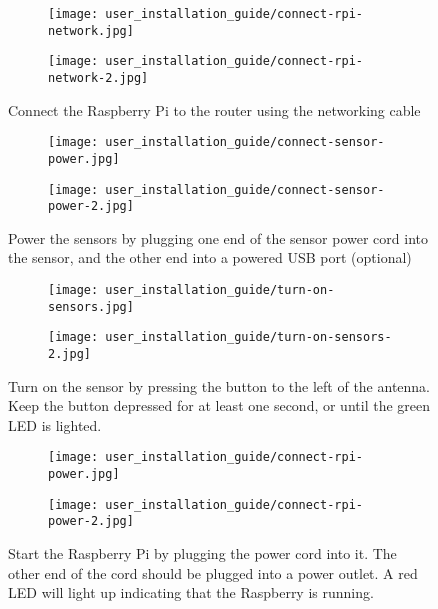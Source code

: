\documentclass[../document.tex]{subfiles}
\begin{document}
\begin{figure}[H]
	\centering
	\begin{subfigure}[h]{0.48\textwidth}
		\texttt{[image: user\_installation\_guide/connect-rpi-network.jpg]}
	\end{subfigure}
	\quad
	\begin{subfigure}[h]{0.48\textwidth}
		\texttt{[image: user\_installation\_guide/connect-rpi-network-2.jpg]}
	\end{subfigure}
	\caption{Connect the Raspberry Pi to the router using the networking cable}
\end{figure}

\begin{figure}[H]
	\centering
	\begin{subfigure}[h]{0.48\textwidth}
		\texttt{[image: user\_installation\_guide/connect-sensor-power.jpg]}
	\end{subfigure}
	\quad
	\begin{subfigure}[h]{0.48\textwidth}
		\texttt{[image: user\_installation\_guide/connect-sensor-power-2.jpg]}
	\end{subfigure}
	\caption{Power the sensors by plugging one end of the sensor power cord into the sensor, and the other end into a powered USB port (optional)}
\end{figure}

\begin{figure}[H]
	\centering
	\begin{subfigure}[h]{0.48\textwidth}
		\texttt{[image: user\_installation\_guide/turn-on-sensors.jpg]}
	\end{subfigure}
	\quad
	\begin{subfigure}[h]{0.48\textwidth}
		\texttt{[image: user\_installation\_guide/turn-on-sensors-2.jpg]}
	\end{subfigure}
	\caption{Turn on the sensor by pressing the button to the left of the antenna. Keep the button depressed for at least one second, or until the green LED is lighted.}
\end{figure}

\begin{figure}[H]
	\centering
	\begin{subfigure}[h]{0.48\textwidth}
		\texttt{[image: user\_installation\_guide/connect-rpi-power.jpg]}
	\end{subfigure}
	\quad
	\begin{subfigure}[h]{0.48\textwidth}
		\texttt{[image: user\_installation\_guide/connect-rpi-power-2.jpg]}
	\end{subfigure}
	\caption{Start the Raspberry Pi by plugging the power cord into it. The other end of the cord should be plugged into a power outlet. A red LED will light up indicating that the Raspberry is running.}
\end{figure}
\end{document}
